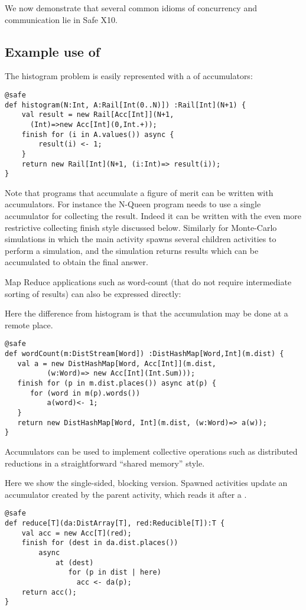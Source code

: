 We now demonstrate that several common idioms of concurrency and
communication lie in Safe X10.

\subsection{Example use of }
\begin{example}[Histogram]
The histogram problem is easily represented with a  of
accumulators: 
\begin{lstlisting}
@safe
def histogram(N:Int, A:Rail[Int(0..N)]) :Rail[Int](N+1) {
    val result = new Rail[Acc[Int]](N+1,
      (Int)=>new Acc[Int](0,Int.+));
    finish for (i in A.values()) async {
        result(i) <- 1;
    }
    return new Rail[Int](N+1, (i:Int)=> result(i));
}
\end{lstlisting}
\end{example}
Note that programs that accumulate a figure of merit can be written
with accumulators. For instance the N-Queen program needs to use a
single accumulator for collecting the result. Indeed it can be written
with the even more restrictive collecting finish style discussed
below. Similarly for Monte-Carlo simulations in which the main
activity spawns several children activities to perform a simulation,
and the simulation returns results which can be accumulated to
obtain the final answer.

Map Reduce applications such as word-count (that do not require
intermediate sorting of results) can also be expressed directly:
\begin{example}
Here the difference from histogram is that the accumulation may be
done at a remote place. 
\begin{lstlisting}
@safe
def wordCount(m:DistStream[Word]) :DistHashMap[Word,Int](m.dist) {
   val a = new DistHashMap[Word, Acc[Int]](m.dist,
          (w:Word)=> new Acc[Int](Int.Sum)));
   finish for (p in m.dist.places()) async at(p) {
      for (word in m(p).words())
          a(word)<- 1;
   }
   return new DistHashMap[Word, Int](m.dist, (w:Word)=> a(w));
}
\end{lstlisting}

\end{example}


Accumulators can be used to implement collective operations such as
distributed reductions in a straightforward ``shared memory'' style.

\begin{example}[Reduction]
Here we show the single-sided, blocking version. Spawned activities
update an accumulator created by the parent activity, which reads it
after a . 
  \begin{lstlisting}
@safe
def reduce[T](da:DistArray[T], red:Reducible[T]):T {
    val acc = new Acc[T](red);
    finish for (dest in da.dist.places())
        async
            at (dest) 
               for (p in dist | here)
                 acc <- da(p);
    return acc();
}
\end{lstlisting}
\end{example}


